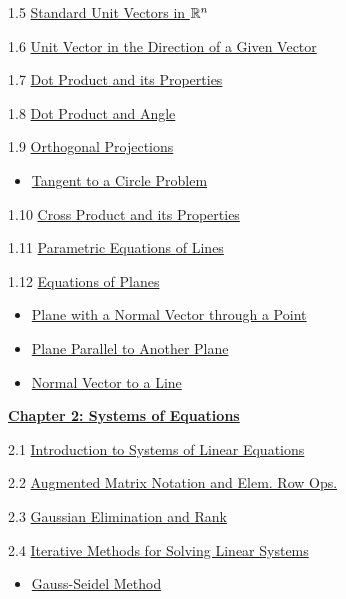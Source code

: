 \documentclass{ximera}
\begin{document}
1.5	\href{https://ximera.osu.edu/oerlinalg/LinearAlgebra/VEC-0035/main}{Standard Unit Vectors in $\mathbb{R}^n$}

1.6	\href{https://ximera.osu.edu/oerlinalg/LinearAlgebra/VEC-0036/main}{Unit Vector in the Direction of a Given Vector}
	
1.7	\href{https://ximera.osu.edu/oerlinalg/LinearAlgebra/VEC-0050/main}{Dot Product and its Properties}
	
1.8	\href{https://ximera.osu.edu/oerlinalg/LinearAlgebra/VEC-0060/main}{Dot Product and Angle }
	
1.9	\href{https://ximera.osu.edu/oerlinalg/LinearAlgebra/VEC-0070/main}{Orthogonal Projections}
\begin{itemize}
    \item 
    \href{https://www.geogebra.org/m/bngnjxee}{Tangent to a Circle Problem}
\end{itemize}
	
1.10	\href{https://ximera.osu.edu/oerlinalg/LinearAlgebra/VEC-0080/main}{Cross Product and its Properties}
	
1.11	\href{https://ximera.osu.edu/oerlinalg/LinearAlgebra/RRN-0020/main}{Parametric Equations of Lines}
	
1.12	\href{https://ximera.osu.edu/oerlinalg/LinearAlgebra/RRN-0030/main}{Equations of Planes}
\begin{itemize}
\item
\href{https://www.geogebra.org/m/gsaag2dx}{Plane with a Normal Vector through a Point}
\item
\href{https://www.geogebra.org/m/unceva9g}{Plane Parallel to Another Plane}
\item
\href{https://www.geogebra.org/m/tg2duwqk}{Normal Vector to a Line}
\end{itemize}	
\href{https://ximera.osu.edu/oerlinalg/LinearAlgebra/XLAChapter_systems/main}{\textbf{Chapter 2: Systems of Equations}}
	
2.1	\href{https://ximera.osu.edu/oerlinalg/LinearAlgebra/SYS-0020/main}{Introduction to Systems of Linear Equations}
	
2.2	\href{https://ximera.osu.edu/oerlinalg/LinearAlgebra/SYS-0030/main}{Augmented Matrix Notation and Elem. Row Ops.}
	
2.3	\href{https://ximera.osu.edu/oerlinalg/LinearAlgebra/SYS-0030/main}{Gaussian Elimination and Rank}
	
2.4	\href{https://ximera.osu.edu/oerlinalg/LinearAlgebra/SYS-0040/main}{Iterative Methods for Solving Linear Systems}
\begin{itemize}
    \item 
    \href{https://www.geogebra.org/m/hndq9nmq}{Gauss-Seidel Method}
\end{itemize}
	
\end{document}
